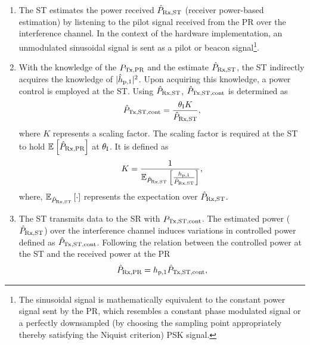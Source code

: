 \begin{enumerate}
	\item The ST estimates the power received $\hat{P}_{\text{Rx,ST}}$ (receiver power-based estimation) by listening to the pilot signal received from the PR over the interference channel. In the context of the hardware implementation, an unmodulated sinusoidal signal is sent as a pilot or beacon signal\footnote{The sinusoidal signal is mathematically equivalent to the constant power signal sent by the PR, which resembles a constant phase modulated signal or a perfectly downsampled (by choosing the sampling point appropriately thereby satisfying the Niquist criterion) PSK signal.}.
	\item With the knowledge of the $P_{\text{Tx,PR}}$ and the estimate $\hat{P}_{\text{Rx,ST}}$, the ST indirectly acquires the knowledge of $|\hat{h}_{\text{p,1}}|^2$. 
	Upon acquiring this knowledge, a power control is employed at the ST. Using $\hat{P}_{\text{Rx,ST}}$, $\hat{P}_{\text{Tx,ST,cont}}$ is determined as 
\begin{align}
\hat{P}_{\text{Tx,ST,cont}} = \frac{\theta_{\text{I}} K}{\hat{P}_{\text{Rx,ST}}}, \label{eq:preg} 
\end{align}
where $K$ represents a scaling factor. The scaling factor is required at the ST to hold ${\mathbb E}_{}\left[ \hat{P}_{\text{Rx,PR}} \right]$ at $\theta_{\text{I}}$. It is defined as
\begin{align}
K = \frac{1}{ {\mathbb E}_{\hat{P}_{\text{Rx,ST}}}\left[ \frac{h_{\text{p,1}}}{\hat{P}_{\text{Rx,ST}}} \right]}, \label{eq:sca} 
\end{align}
where, ${\mathbb E}_{\hat{P}_{\text{Rx,ST}}}\left[ \cdot \right]$ represents the expectation over $\hat{P}_{\text{Rx,ST}}$.
	\item The ST transmits data to the SR with $P_{\text{Tx,ST,cont}}$. 
	The estimated power ($\hat{P}_{\text{Rx,ST}}$) over the interference channel induces variations in controlled power defined as $\hat{P}_{\text{Tx,ST,cont}}$. Following the relation between the controlled power at the ST and the received power at the PR 
\begin{align}
\hat{P}_{\text{Rx,PR}}  = h_{\text{p,1}} \hat{P}_{\text{Tx,ST,cont}},
\label{eq:eprcvdpr}
\end{align}

\end{enumerate}
